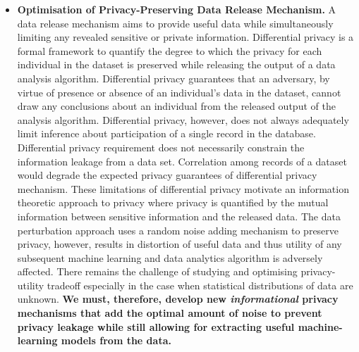 \documentclass[a4paper,11pt]{article}
\begin{document}
\begin{itemize}
\item \textbf{Optimisation of Privacy-Preserving Data Release Mechanism.} A data release mechanism aims to provide useful data %
while simultaneously limiting any revealed sensitive or private information. %
Differential privacy is a formal framework to quantify the degree to which the privacy for each individual in the dataset is preserved while releasing the output of a data analysis algorithm. Differential privacy guarantees that an adversary, by virtue of presence or absence of an individual's data in the dataset, cannot draw any conclusions about an individual from the released output of the analysis algorithm. Differential privacy, however, does not always adequately limit inference about participation of a single record in the database. Differential privacy requirement does not necessarily constrain the information leakage from a data set. Correlation among records of a dataset would degrade the expected privacy guarantees of differential privacy mechanism. These limitations of differential privacy motivate an information theoretic approach to privacy where privacy is quantified by the mutual information between sensitive information and the released data. The data perturbation approach uses a random noise adding mechanism to preserve privacy, however, results in distortion of useful data and thus utility of any subsequent machine learning and data analytics algorithm is adversely affected. There remains the challenge of studying and optimising privacy-utility tradeoff especially in the case when statistical distributions of data are unknown. \textbf{We must, therefore, develop new \emph{informational} privacy mechanisms that add the optimal amount of noise to prevent privacy leakage while still allowing for extracting useful machine-learning models from the data.}



\end{itemize}
\end{document}
